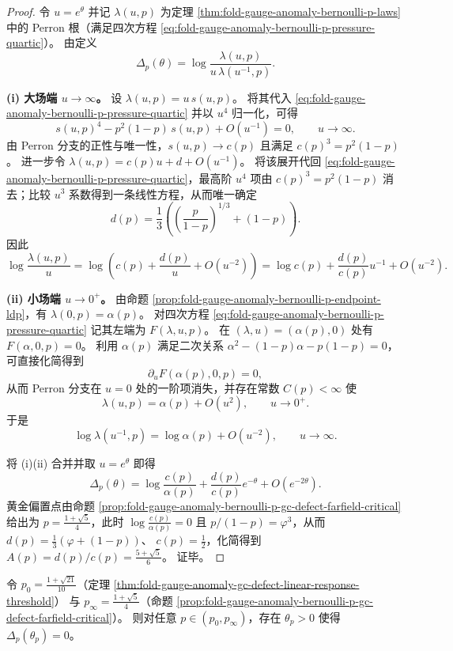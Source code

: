 \begin{proof}
令 \(u=e^\theta\) 并记 \(\lambda(u,p)\) 为定理 \ref{thm:fold-gauge-anomaly-bernoulli-p-laws} 中的 Perron 根（满足四次方程 \eqref{eq:fold-gauge-anomaly-bernoulli-p-pressure-quartic}）。
由定义
\[
\Delta_p(\theta)=\log\frac{\lambda(u,p)}{u\,\lambda(u^{-1},p)}.
\]
\par
\textbf{(i) 大场端 \(u\to\infty\)。}
设 \(\lambda(u,p)=u\,s(u,p)\)。
将其代入 \eqref{eq:fold-gauge-anomaly-bernoulli-p-pressure-quartic} 并以 \(u^4\) 归一化，可得
\[
s(u,p)^4-p^2(1-p)\,s(u,p)+O(u^{-1})=0,
\qquad u\to\infty.
\]
由 Perron 分支的正性与唯一性，\(s(u,p)\to c(p)\) 且满足 \(c(p)^3=p^2(1-p)\)。
进一步令
\(
\lambda(u,p)=c(p)u+d+O(u^{-1})
\)。
将该展开代回 \eqref{eq:fold-gauge-anomaly-bernoulli-p-pressure-quartic}，最高阶 \(u^4\) 项由 \(c(p)^3=p^2(1-p)\) 消去；比较 \(u^3\) 系数得到一条线性方程，从而唯一确定
\[
d(p)=\frac13\left(\left(\frac{p}{1-p}\right)^{1/3}+(1-p)\right).
\]
因此
\[
\log\frac{\lambda(u,p)}{u}
=\log\left(c(p)+\frac{d(p)}{u}+O(u^{-2})\right)
=\log c(p)+\frac{d(p)}{c(p)}u^{-1}+O(u^{-2}).
\]
\par
\textbf{(ii) 小场端 \(u\to 0^+\)。}
由命题 \ref{prop:fold-gauge-anomaly-bernoulli-p-endpoint-ldp}，有 \(\lambda(0,p)=\alpha(p)\)。
对四次方程 \eqref{eq:fold-gauge-anomaly-bernoulli-p-pressure-quartic} 记其左端为 \(F(\lambda,u,p)\)。
在 \((\lambda,u)=(\alpha(p),0)\) 处有 \(F(\alpha,0,p)=0\)。
利用 \(\alpha(p)\) 满足二次关系 \(\alpha^2-(1-p)\alpha-p(1-p)=0\)，可直接化简得到
\[
\partial_u F(\alpha(p),0,p)=0,
\]
从而 Perron 分支在 \(u=0\) 处的一阶项消失，并存在常数 \(C(p)<\infty\) 使
\[
\lambda(u,p)=\alpha(p)+O(u^2),
\qquad u\to 0^+.
\]
于是
\[
\log\lambda(u^{-1},p)=\log\alpha(p)+O(u^{-2}),
\qquad u\to\infty.
\]
\par
将 (i)(ii) 合并并取 \(u=e^\theta\) 即得
\[
\Delta_p(\theta)=\log\frac{c(p)}{\alpha(p)}+\frac{d(p)}{c(p)}e^{-\theta}+O(e^{-2\theta}).
\]
黄金偏置点由命题 \ref{prop:fold-gauge-anomaly-bernoulli-p-gc-defect-farfield-critical} 给出为 \(p=\frac{1+\sqrt5}{4}\)，此时 \(\log\frac{c(p)}{\alpha(p)}=0\) 且 \(p/(1-p)=\varphi^3\)，从而
\(
d(p)=\frac13(\varphi+(1-p))
\)、
\(
c(p)=\tfrac12
\)，化简得到 \(A(p)=d(p)/c(p)=\frac{5+\sqrt5}{6}\)。
证毕。
\end{proof}

\begin{corollary}[必然零点区间与区间夹逼]\label{cor:fold-gauge-anomaly-gc-defect-must-cross}
令
\(
p_0=\frac{1+\sqrt{21}}{10}
\)（定理 \ref{thm:fold-gauge-anomaly-gc-defect-linear-response-threshold}）
与
\(
p_\infty=\frac{1+\sqrt5}{4}
\)（命题 \ref{prop:fold-gauge-anomaly-bernoulli-p-gc-defect-farfield-critical}）。
则对任意 \(p\in(p_0,p_\infty)\)，存在 \(\theta_p>0\) 使得 \(\Delta_p(\theta_p)=0\)。
\end{corollary}


